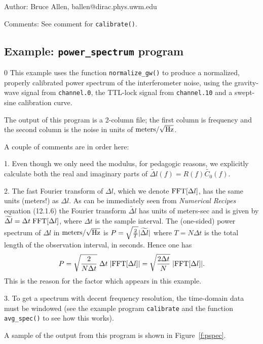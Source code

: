 \begin{description}
\item{Author:}  Bruce Allen, ballen@dirac.phys.uwm.edu
\item{Comments:}  See comment for {\tt calibrate()}.
\end{description}
\clearpage

\subsection{Example: {\tt power\_spectrum} program}
\setcounter{equation}0
This example uses the function {\tt normalize\_gw()} to produce a
normalized, properly calibrated power spectrum of the interferometer
noise, using the gravity-wave signal from {\tt channel.0}, the TTL-lock
signal from {\tt channel.10} and a swept-sine calibration curve.

The output of this program is a 2-column file; the first column is
frequency and the second column is the noise in units of $\rm
meters/\sqrt{\rm Hz}$.

A couple of comments are in order here:
\begin{description}
\item{1.} 
Even though we only need the modulus, for pedagogic reasons, we explicitly
calculate both the real and imaginary parts of $\widetilde{\Delta l}(f)=
R(f) \widetilde{C_0}(f)$.
\item{2.}
The fast Fourier transform of $\Delta l$, which we denote ${\rm
FFT}[\Delta l]$, has the same units (meters!) as $\Delta l$.  As can be
immediately seen from {\it Numerical Recipes} equation (12.1.6) the
Fourier transform $\widetilde{\Delta l}$ has units of meters-sec and is
given by $\widetilde{\Delta l} =\Delta t \; {\rm FFT}[\Delta l]$, where
$\Delta t$ is the sample interval.  The (one-sided) power spectrum of
$\Delta l$ in $\rm meters/\sqrt{\rm Hz}$ is $P=\sqrt{2 \over T}
| \widetilde{\Delta l} | $ where $T=N \Delta t$ is the total length of the
observation interval, in seconds.  Hence one has
\begin{equation}
P=\sqrt{2 \over N \Delta t} \; \Delta t \; | {\rm FFT}[\Delta l] |=
\sqrt{2 \Delta t \over N} \; | {\rm FFT}[\Delta l] |.
\end{equation}
This is the reason for the factor which appears in
this example.
\item{3.} To get a spectrum with decent frequency resolution, the time-domain
data must be windowed (see the example program {\tt calibrate} and the function
{\tt avg\_spec()} to see how this works).
\end{description}
A sample of the output from this program is shown in Figure~\ref{f:pspec}.

